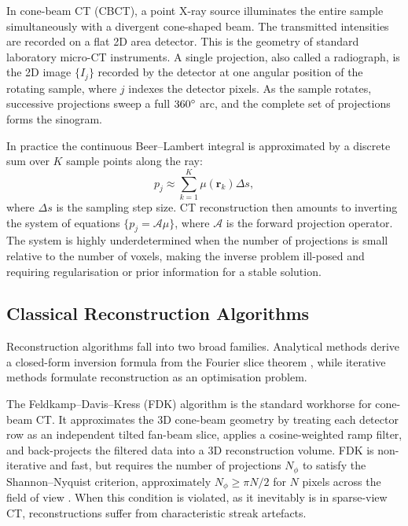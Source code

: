 \documentclass[12pt, a4paper, twoside]{report}
\begin{document}
In cone-beam CT (CBCT), a point X-ray source illuminates the entire sample simultaneously with a divergent cone-shaped beam. The transmitted intensities are recorded on a flat 2D area detector. This is the geometry of standard laboratory micro-CT instruments. A single projection, also called a radiograph, is the 2D image $\{I_j\}$ recorded by the detector at one angular position of the rotating sample, where $j$ indexes the detector pixels. As the sample rotates, successive projections sweep a full $360\degree$ arc, and the complete set of projections forms the sinogram.

In practice the continuous Beer--Lambert integral is approximated by a discrete sum over $K$ sample points along the ray:
%
\begin{equation}
    p_j \approx \sum_{k=1}^{K} \mu\!\left(\mathbf{r}_k\right) \Delta s,
    \label{eq:discrete_projection}
\end{equation}
%
where $\Delta s$ is the sampling step size. CT reconstruction then amounts to inverting the system of equations $\{p_j = \mathcal{A}\mu\}$, where $\mathcal{A}$ is the forward projection operator. The system is highly underdetermined when the number of projections is small relative to the number of voxels, making the inverse problem ill-posed and requiring regularisation or prior information for a stable solution.

\subsection{Classical Reconstruction Algorithms}
\label{subsec:ct_algorithms}

Reconstruction algorithms fall into two broad families. Analytical methods derive a closed-form inversion formula from the Fourier slice theorem \citep{radon1917, kak2001principles}, while iterative methods formulate reconstruction as an optimisation problem.

The Feldkamp--Davis--Kress (FDK) algorithm \citep{feldkamp1984} is the standard workhorse for cone-beam CT. It approximates the 3D cone-beam geometry by treating each detector row as an independent tilted fan-beam slice, applies a cosine-weighted ramp filter, and back-projects the filtered data into a 3D reconstruction volume. FDK is non-iterative and fast, but requires the number of projections $N_\phi$ to satisfy the Shannon--Nyquist criterion, approximately $N_\phi \geq \pi N / 2$ for $N$ pixels across the field of view \citep{kak2001principles}. When this condition is violated, as it inevitably is in sparse-view CT, reconstructions suffer from characteristic streak artefacts.
\end{document}
